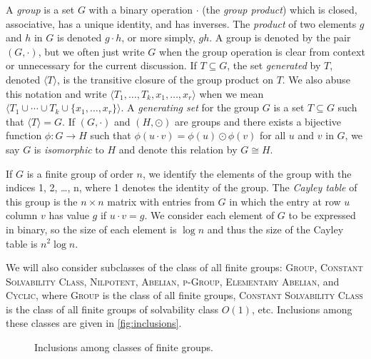 \documentclass{article}
\newcommand{\gen}[1]{{\langle #1 \rangle}}
\begin{document}
A \emph{group} is a set $G$ with a binary operation $\cdot$ (the \emph{group product}) which is closed, associative, has a unique identity, and has inverses.
The \emph{product} of two elements $g$ and $h$ in $G$ is denoted $g \cdot h$, or more simply, $gh$.
A group is denoted by the pair $(G, \cdot)$, but we often just write $G$ when the group operation is clear from context or unnecessary for the current discussion.
If $T \subseteq G$, the set \emph{generated} by $T$, denoted $\gen{T}$, is the transitive closure of the group product on $T$.
We also abuse this notation and write $\gen{T_1, \dotsc, T_k , x_1, \dotsc, x_r}$ when we mean $\gen{T_1 \cup \dotsb \cup T_k \cup \{x_1, \dotsc, x_r\}}$.
A \emph{generating set} for the group $G$ is a set $T \subseteq G$ such that $\gen{T} = G$.
If $(G, \cdot)$ and $(H, \odot)$ are groups and there exists a bijective function $\phi \colon G \to H$ such that $\phi(u \cdot v) = \phi(u) \odot \phi(v)$ for all $u$ and $v$ in $G$, we say $G$ is \emph{isomorphic} to $H$ and denote this relation by $G \cong H$.

If $G$ is a finite group of order $n$, we identify the elements of the group with the indices 1, 2, \ldots, n, where 1 denotes the identity of the group.
The \emph{Cayley table} of this group is the $n \times n$ matrix with entries from $G$ in which the entry at row $u$ column $v$ has value $g$ if $u \cdot v = g$.
We consider each element of $G$ to be expressed in binary, so the size of each element is $\log n$ and thus the size of the Cayley table is $n^2 \log n$.

We will also consider subclasses of the class of all finite groups: \textsc{Group}, \textsc{Constant Solvability Class}, \textsc{Nilpotent}, \textsc{Abelian}, \textsc{p-Group}, \textsc{Elementary Abelian}, and \textsc{Cyclic}, where \textsc{Group} is the class of all finite groups, \textsc{Constant Solvability Class} is the class of all finite groups of solvability class $O(1)$, etc.
Inclusions among these classes are given in \autoref{fig:inclusions}.
\begin{figure}
  \caption{Inclusions among classes of finite groups.\label{fig:inclusions}}
  \begin{center}
  \end{center}
\end{figure}
\end{document}
